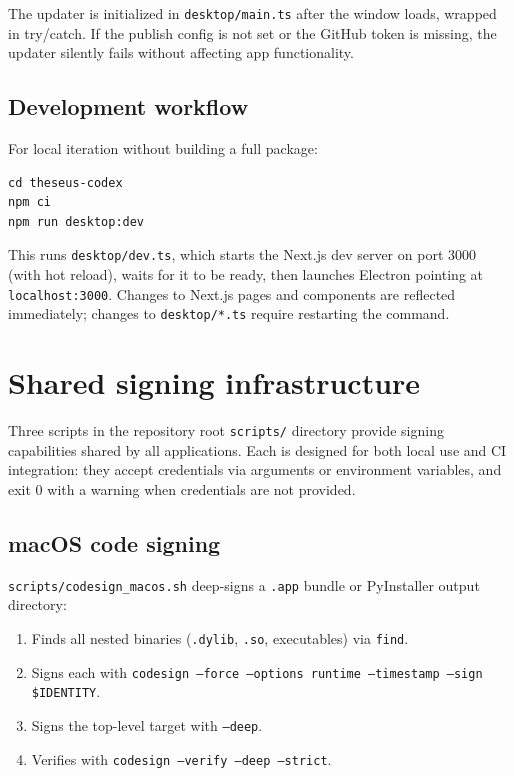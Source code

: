 \documentclass[11pt,letterpaper]{article}
\newcommand{\file}[1]{\texttt{#1}}
\newcommand{\cmd}[1]{\texttt{#1}}
\begin{document}
The updater is initialized in \file{desktop/main.ts} after the window loads, wrapped in try/catch. If the publish config is not set or the GitHub token is missing, the updater silently fails without affecting app functionality.

\subsection{Development workflow}

For local iteration without building a full package:
\begin{lstlisting}
cd theseus-codex
npm ci
npm run desktop:dev
\end{lstlisting}

This runs \file{desktop/dev.ts}, which starts the Next.js dev server on port 3000 (with hot reload), waits for it to be ready, then launches Electron pointing at \cmd{localhost:3000}. Changes to Next.js pages and components are reflected immediately; changes to \file{desktop/*.ts} require restarting the command.

\section{Shared signing infrastructure}

Three scripts in the repository root \file{scripts/} directory provide signing capabilities shared by all applications. Each is designed for both local use and CI integration: they accept credentials via arguments or environment variables, and exit 0 with a warning when credentials are not provided.

\subsection{macOS code signing}

\file{scripts/codesign\_macos.sh} deep-signs a \file{.app} bundle or PyInstaller output directory:

\begin{enumerate}[leftmargin=1.5em,itemsep=0.1em]
  \item Finds all nested binaries (\file{.dylib}, \file{.so}, executables) via \cmd{find}.
  \item Signs each with \cmd{codesign --force --options runtime --timestamp --sign \$IDENTITY}.
  \item Signs the top-level target with \cmd{--deep}.
  \item Verifies with \cmd{codesign --verify --deep --strict}.
\end{enumerate}
\end{document}
